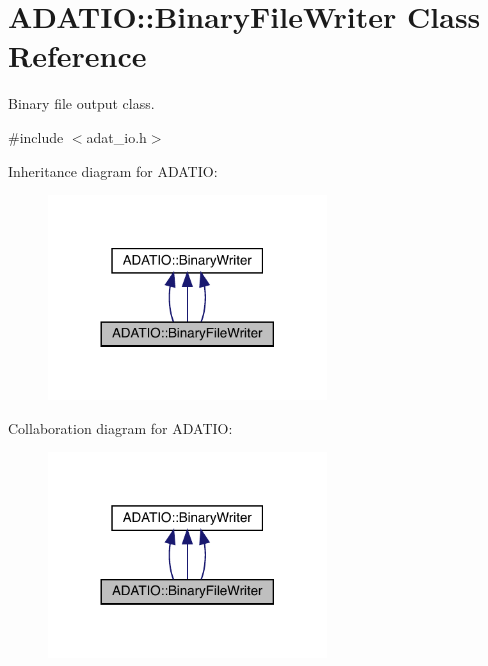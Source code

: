 \hypertarget{classADATIO_1_1BinaryFileWriter}{}\section{A\+D\+A\+T\+IO\+:\+:Binary\+File\+Writer Class Reference}
\label{classADATIO_1_1BinaryFileWriter}


Binary file output class.  




{\ttfamily \#include $<$adat\+\_\+io.\+h$>$}



Inheritance diagram for A\+D\+A\+T\+IO\+:
\nopagebreak
\begin{figure}[H]
\begin{center}
\leavevmode
\includegraphics[width=209pt]{d1/d42/classADATIO_1_1BinaryFileWriter__inherit__graph}
\end{center}
\end{figure}


Collaboration diagram for A\+D\+A\+T\+IO\+:
\nopagebreak
\begin{figure}[H]
\begin{center}
\leavevmode
\includegraphics[width=209pt]{d9/dce/classADATIO_1_1BinaryFileWriter__coll__graph}
\end{center}
\end{figure}
